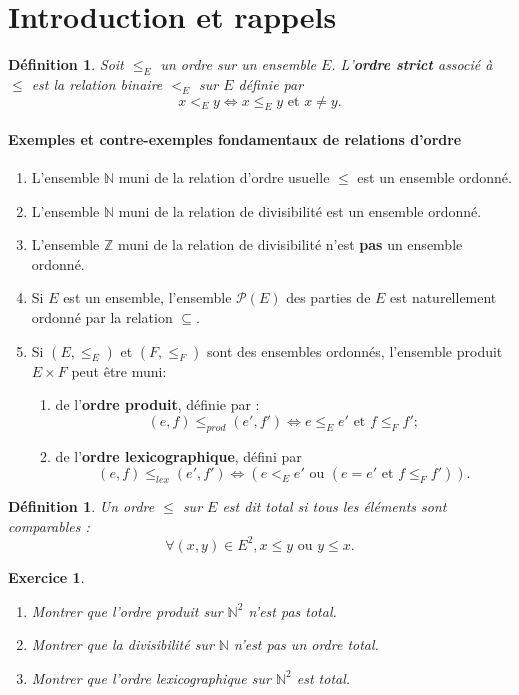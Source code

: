 \documentclass[12pt]{article}
\newtheorem*{exo}{Exercice}
\newtheorem{definition}[thm]{Définition}
\newcommand{\N}{\mathbb{N}}
\newcommand{\Z}{\mathbb{Z}}
\begin{document}
\section{Introduction et rappels}

\begin{definition}
Soit $\leq_E$ un ordre sur un ensemble $E$.
L'\textbf{ordre strict} associé à $\leq$ est la relation binaire $<_E$ sur $E$ définie par 
\[ x <_E y \iff x\leq_E y \text{ et } x\neq y.\]
 \end{definition}

\paragraph{Exemples  et contre-exemples fondamentaux de relations d'ordre}
\begin{enumerate}
\item L'ensemble $\N$ muni de la relation d'ordre usuelle $\leq$ est un ensemble ordonné. 
\item L'ensemble $\N$ muni de la relation de divisibilité est un ensemble ordonné.
\item L'ensemble $\Z$ muni de la relation de divisibilité n'est \textbf{pas} un ensemble ordonné.
\item Si $E$ est un ensemble, l'ensemble $\mathcal P(E)$ des parties de $E$ est naturellement  ordonné par la relation $\subseteq$.
\item Si $(E,\leq_E)$ et $(F,\leq_F)$ sont des ensembles ordonnés, l'ensemble produit $E\times F$ peut être muni:
\begin{enumerate}
\item de l'\textbf{ordre produit}, définie par :
\[ (e,f) \leq_{prod} (e',f') \iff e\leq_E e' \text{ et }f\leq_F f';\]
\item de l'\textbf{ordre lexicographique}, défini par 
\[ (e,f) \leq_{lex} (e',f') \iff (e <_E e' \text{ ou } (e=e' \text{ et }f\leq_F f') ).\]
\end{enumerate}
\end{enumerate}

 
 
 \begin{definition}
 Un ordre $\leq$ sur $E$ est dit \emph{total} si tous les éléments sont comparables : 
 \[ \forall (x,y)\in E^2, x\leq y \text{ ou } y\leq x.\]
 \end{definition}
 
\begin{exo}
\begin{enumerate}
\item Montrer que l'ordre produit sur $\N^2$ n'est pas total.
\item Montrer que la divisibilité sur $\N$ n'est pas un ordre total.
\item Montrer que l'ordre lexicographique sur $\N^2$ est total.
\end{enumerate}
\end{exo}
\end{document}
